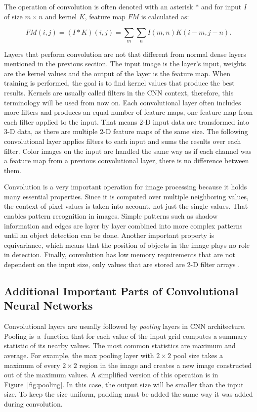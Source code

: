 The operation of convolution is often denoted with an asterisk $*$ and for input $I$ of size $m \times n$ and kernel $K$, feature map $FM$ is calculated as:

\begin{equation}
    FM(i, j) = (I * K)(i, j) = \sum\limits_m \sum\limits_n I(m, n) K(i-m, j-n).
\end{equation}

Layers that perform convolution are not that different from normal dense layers mentioned in the previous section. The input image is the layer's input, weights are the kernel values and the output of the layer is the feature map. When training is performed, the goal is to find kernel values that produce the best results. Kernels are usually called filters in the CNN context, therefore, this terminology will be used from now on. Each convolutional layer often includes more filters and produces an equal number of feature maps, one feature map from each filter applied to the input. That means 2-D input data are transformed into 3-D data, as there are multiple 2-D feature maps of the same size. The following convolutional layer applies filters to each input and sums the results over each filter. Color images on the input are handled the same way as if each channel was a feature map from a previous convolutional layer, there is no difference between them.

Convolution is a very important operation for image processing because it holds many essential properties. Since it is computed over multiple neighboring values, the context of pixel values is taken into account, not just the single values. That enables pattern recognition in images. Simple patterns such as shadow information and edges are layer by layer combined into more complex patterns until an object detection can be done. Another important property is equivariance, which means that the position of objects in the image plays no role in detection. Finally, convolution has low memory requirements that are not dependent on the input size, only values that are stored are 2-D filter arrays \cite{Goodfellow-et-al-2016}.

\subsection{\label{sec:other-cnn-ops}Additional Important Parts of Convolutional Neural Networks}

Convolutional layers are usually followed by \textit{pooling} layers in CNN architecture. Pooling is~a~function that for each value of the input grid computes a summary statistic of its nearby values. The most common statistics are maximum and average. For example, the max pooling layer with $2 \times 2$ pool size takes a maximum of every $2 \times 2$ region in the image and creates a new image constructed out of the maximum values. A simplified version of this operation is in Figure~\ref{fig:pooling}. In this case, the output size will be smaller than the input size. To keep the size uniform, padding must be added the same way it was added during convolution.

